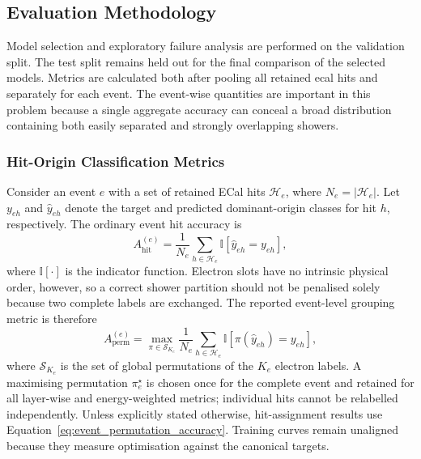 \subsection{Evaluation Methodology}
\label{sec:method_evaluation}

Model selection and exploratory failure analysis are performed on the
validation split. The test split remains held out for the final comparison of
the selected models. Metrics are calculated both after pooling all retained
\gls{ecal} hits and separately for each event. The event-wise quantities are
important in this problem because a single aggregate accuracy can conceal a
broad distribution containing both easily separated and strongly overlapping
showers.

\subsubsection{Hit-Origin Classification Metrics}

Consider an event \(e\) with a set of retained ECal hits
\(\mathcal{H}_e\), where \(N_e=|\mathcal{H}_e|\). Let \(y_{eh}\) and
\(\widehat{y}_{eh}\) denote the target and predicted dominant-origin classes
for hit \(h\), respectively. The ordinary event hit accuracy is
\begin{equation}
    A_{\mathrm{hit}}^{(e)}
    =
    \frac{1}{N_e}
    \sum_{h \in \mathcal{H}_e}
    \mathbb{I}
    \!\left[\widehat{y}_{eh}=y_{eh}\right],
    \label{eq:event_hit_accuracy}
\end{equation}
where \(\mathbb{I}[\cdot]\) is the indicator function. Electron slots have no
intrinsic physical order, however, so a correct shower partition should not be
penalised solely because two complete labels are exchanged. The reported
event-level grouping metric is therefore
\begin{equation}
    A_{\mathrm{perm}}^{(e)}
    =
    \max_{\pi\in\mathcal{S}_{K_e}}
    \frac{1}{N_e}
    \sum_{h\in\mathcal{H}_e}
    \mathbb{I}
    \!\left[\pi(\widehat y_{eh})=y_{eh}\right],
    \label{eq:event_permutation_accuracy}
\end{equation}
where \(\mathcal{S}_{K_e}\) is the set of global permutations of the
\(K_e\) electron labels. A maximising permutation \(\pi_e^\star\) is chosen
once for the complete event and retained for all layer-wise and
energy-weighted metrics; individual hits cannot be relabelled independently.
Unless explicitly stated otherwise, hit-assignment results use
Equation~\eqref{eq:event_permutation_accuracy}. Training curves remain
unaligned because they measure optimisation against the canonical targets.

